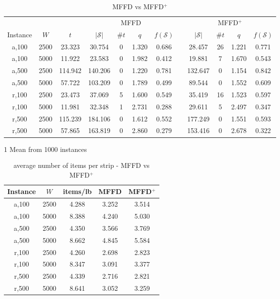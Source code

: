 \documentclass{elsarticle}
\begin{document}
\begin{table}[h!]
	\centering
\caption{MFFD vs MFFD$^+$}
\begin{threeparttable}
\begin{tabular}{cccccccccccc}\toprule
	& & & \multicolumn{4}{c}{MFFD} &\phantom{a}& \multicolumn{4}{c}{MFFD$^+$}\\
	\cmidrule{4-7} \cmidrule{9-12}
	Instance & $W$ & $t$ & $|\mathcal{S}|$\tnote{1} & $\# t$ & $q$ & $f(\mathcal{S})$ && $|\mathcal{S}|$ & $\# t$ & $q$ & $f(\mathcal{S})$\\ \midrule	
	a,100 & 2500 & 23.323 & 30.754 & 0 & 1.320 & 0.686 && 28.457 & 26 & 1.221 & 0.771 \\
	a,100 & 5000 & 11.922 & 23.583 & 0 & 1.982 & 0.412 && 19.881 & 7 & 1.670 & 0.543  \\
	\midrule
	a,500 & 2500 & 114.942 & 140.206 & 0 & 1.220 & 0.781 && 132.647 & 0 & 1.154 & 0.842 \\
	a,500 & 5000 & 57.722 & 103.209 & 0 & 1.789 & 0.499 && 89.544 & 0 & 1.552 & 0.609 \\
	\midrule
	\midrule
	r,100 & 2500 & 23.473 & 37.069 & 5 & 1.600 & 0.549 && 35.419 & 16 & 1.523 & 0.597 \\
	r,100 & 5000 & 11.981 & 32.348 & 1 & 2.731 & 0.288 && 29.611 & 5 & 2.497 & 0.347 \\
	\midrule
	r,500 & 2500 & 115.239 & 184.106 & 0 & 1.612 & 0.552 && 177.249 & 0 & 1.551 & 0.593 \\
	r,500 & 5000 & 57.865 & 163.819 & 0 & 2.860 & 0.279 && 153.416 & 0 & 2.678 & 0.322 \\
	\bottomrule
\end{tabular}
\begin{tablenotes}
	\item[1] Mean from 1000 instances
\end{tablenotes}	
\end{threeparttable}	
\label{table:MFFD}
\end{table}

\begin{table}[h!]
\centering
\caption{average number of items per strip - MFFD vs MFFD$^+$}
	\begin{tabular}{ccccc}\toprule
		Instance & $W$ & items/lb & MFFD & MFFD$^+$ \\ \midrule	
		a,100 & 2500 & 4.288 & 3.252 & 3.514 \\
		a,100 & 5000 & 8.388 & 4.240 & 5.030 \\
		\midrule
		a,500 & 2500 & 4.350 & 3.566 & 3.769 \\
		a,500 & 5000 & 8.662 & 4.845 & 5.584 \\
		\midrule
		\midrule
		r,100 & 2500 & 4.260 & 2.698 & 2.823 \\
		r,100 & 5000 & 8.347 & 3.091 & 3.377 \\
		\midrule
		r,500 & 2500 & 4.339 & 2.716 & 2.821 \\
		r,500 & 5000 & 8.641 & 3.052 & 3.259 \\
		\bottomrule
	\end{tabular}	
\end{table}
\end{document}
